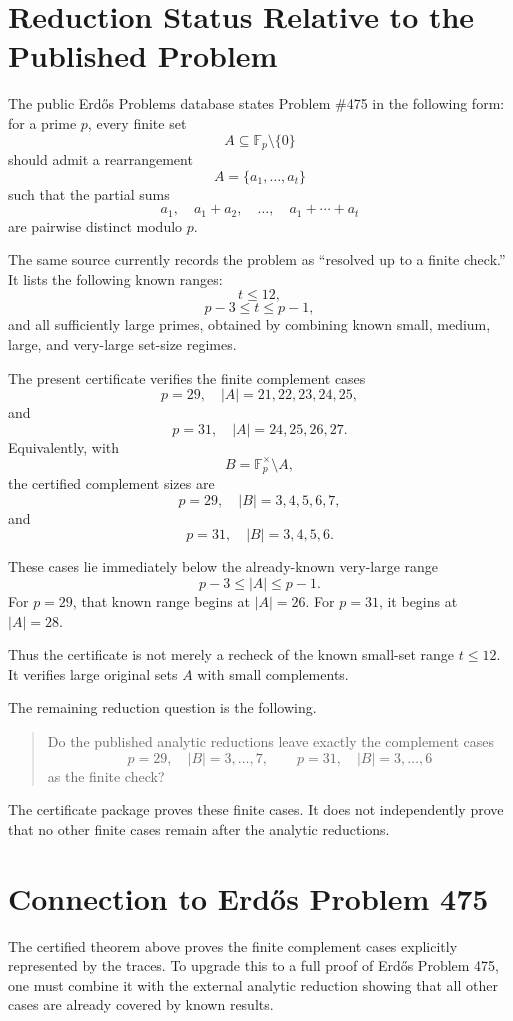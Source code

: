 \documentclass[11pt]{article}
\begin{document}
\section{Reduction Status Relative to the Published Problem}

The public Erd\H{o}s Problems database states Problem \#475 in the following form: for a prime \(p\), every finite set
\[
A\subseteq \mathbb F_p\setminus\{0\}
\]
should admit a rearrangement
\[
A=\{a_1,\ldots,a_t\}
\]
such that the partial sums
\[
a_1,\quad a_1+a_2,\quad \ldots,\quad a_1+\cdots+a_t
\]
are pairwise distinct modulo \(p\).

The same source currently records the problem as ``resolved up to a finite check.'' It lists the following known ranges:
\[
t\le 12,
\]
\[
p-3\le t\le p-1,
\]
and all sufficiently large primes, obtained by combining known small, medium, large, and very-large set-size regimes.

The present certificate verifies the finite complement cases
\[
p=29,\quad |A|=21,22,23,24,25,
\]
and
\[
p=31,\quad |A|=24,25,26,27.
\]
Equivalently, with
\[
B=\mathbb F_p^\times\setminus A,
\]
the certified complement sizes are
\[
p=29,\quad |B|=3,4,5,6,7,
\]
and
\[
p=31,\quad |B|=3,4,5,6.
\]

These cases lie immediately below the already-known very-large range
\[
p-3\le |A|\le p-1.
\]
For \(p=29\), that known range begins at \(|A|=26\). For \(p=31\), it begins at \(|A|=28\).

Thus the certificate is not merely a recheck of the known small-set range \(t\le12\). It verifies large original sets \(A\) with small complements.

The remaining reduction question is the following.

\begin{quote}
Do the published analytic reductions leave exactly the complement cases
\[
p=29,\quad |B|=3,\ldots,7,
\qquad
p=31,\quad |B|=3,\ldots,6
\]
as the finite check?
\end{quote}

The certificate package proves these finite cases. It does not independently prove that no other finite cases remain after the analytic reductions.

\section{Connection to Erd\H{o}s Problem 475}

The certified theorem above proves the finite complement cases explicitly represented by the traces. To upgrade this to a full proof of Erd\H{o}s Problem 475, one must combine it with the external analytic reduction showing that all other cases are already covered by known results.
\end{document}
